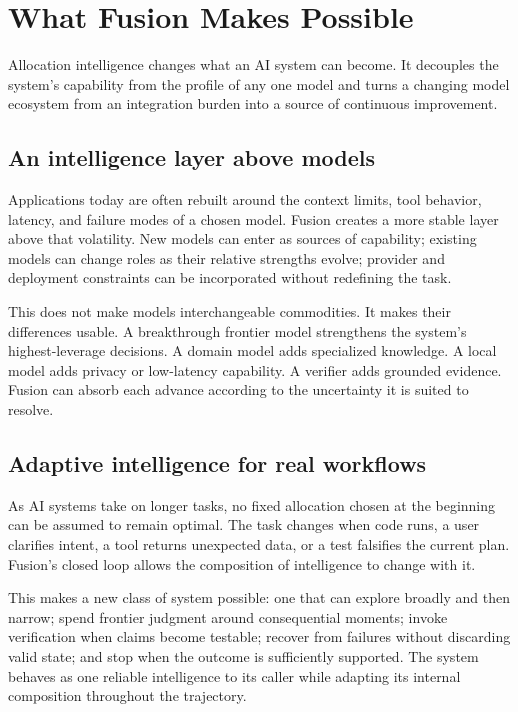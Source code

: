 \section{What Fusion Makes Possible}

Allocation intelligence changes what an AI system can become. It decouples the
system's capability from the profile of any one model and turns a changing
model ecosystem from an integration burden into a source of continuous
improvement.

\subsection{An intelligence layer above models}

Applications today are often rebuilt around the context limits, tool behavior,
latency, and failure modes of a chosen model. Fusion creates a more stable
layer above that volatility. New models can enter as sources of capability;
existing models can change roles as their relative strengths evolve; provider
and deployment constraints can be incorporated without redefining the task.

This does not make models interchangeable commodities. It makes their
differences usable. A breakthrough frontier model strengthens the system's
highest-leverage decisions. A domain model adds specialized knowledge. A local
model adds privacy or low-latency capability. A verifier adds grounded
evidence. Fusion can absorb each advance according to the uncertainty it is
suited to resolve.

\subsection{Adaptive intelligence for real workflows}

As AI systems take on longer tasks, no fixed allocation chosen at the beginning
can be assumed to remain optimal. The task changes when code runs, a user
clarifies intent, a tool returns unexpected data, or a test falsifies the
current plan. Fusion's closed loop allows the composition of intelligence to
change with it.

This makes a new class of system possible: one that can explore broadly and
then narrow; spend frontier judgment around consequential moments; invoke
verification when claims become testable; recover from failures without
discarding valid state; and stop when the outcome is sufficiently supported.
The system behaves as one reliable intelligence to its caller while adapting
its internal composition throughout the trajectory.

